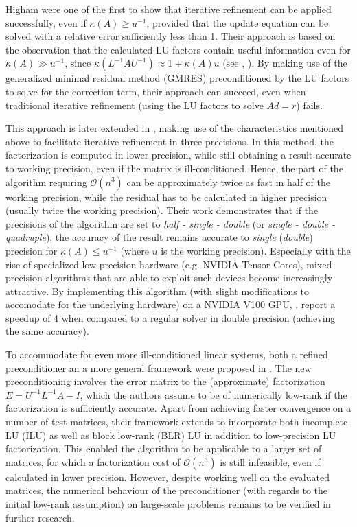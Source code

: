Higham \cite{carson_new_2017} were one of the first to show that iterative refinement can be applied successfully, even if $\kappa(A) \geq u^{-1}$, provided that the update equation can be solved with a relative error sufficiently less than 1. Their approach is based on the observation that the calculated LU factors contain useful information even for $\kappa(A) \gg u^{-1}$, since $\kappa(L^{-1}AU^{-1}) \approx 1+\kappa(A)u$ (see \cite{rump_approximate_1990}, \cite{rump_inversion_2009}). By making use of the generalized minimal residual method (GMRES) \cite{saad_gmres_1986} preconditioned by the LU factors to solve for the correction term, their approach can succeed, even when traditional iterative refinement (using the LU factors to solve $Ad=r$) fails.

This approach is later extended in \cite{carson_accelerating_2018}, making use of the characteristics mentioned above to facilitate iterative refinement in three precisions. In this method, the factorization is computed in lower precision, while still obtaining a result accurate to working precision, even if the matrix is ill-conditioned. Hence, the part of the algorithm requiring $\mathcal{O}(n^3)$ can be approximately twice as fast in half of the working precision, while the residual has to be calculated in higher precision (usually twice the working precision). Their work demonstrates that if the precisions of the algorithm are set to \textit{half - single - double} (or \textit{single - double - quadruple}), the accuracy of the result remains accurate to \textit{single} (\textit{double}) precision for $\kappa(A) \leq u^{-1}$ (where $u$ is the working precision). Especially with the rise of specialized low-precision hardware (e.g. NVIDIA Tensor Cores), mixed precision algorithms that are able to exploit such devices become increasingly attractive. By implementing this algorithm (with slight modifications to accomodate for the underlying hardware) on a NVIDIA V100 GPU, \cite{haidar_harnessing_2018}, report a speedup of 4 when compared to a regular solver in double precision (achieving the same accuracy).

To accommodate for even more ill-conditioned linear systems, both a refined preconditioner an a more general framework were proposed in \cite{higham_new_2019}. The new preconditioning involves the error matrix to the (approximate) factorization $E=U^{-1}L^{-1}A - I$, which the authors assume to be of numerically low-rank if the factorization is sufficiently accurate. Apart from achieving faster convergence on a number of test-matrices, their framework extends to incorporate both incomplete LU (ILU) \cite{saad_iterative_2003} as well as block low-rank (BLR) LU \cite{amestoy_improving_2015} in addition to low-precision LU factorization. This enabled the algorithm to be applicable to a larger set of matrices, for which a factorization cost of $\mathcal{O}(n^3)$ is still infeasible, even if calculated in lower precision. However, despite working well on the evaluated matrices, the numerical behaviour of the preconditioner (with regards to the initial low-rank assumption) on large-scale problems remains to be verified in further research.



